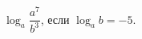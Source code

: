 \begin{ex}
	\begin{condition}
		\( \log_a\dfrac{a^7}{b^3} \), если \( \log_a b = -5 \).
	\end{condition}
\end{ex}